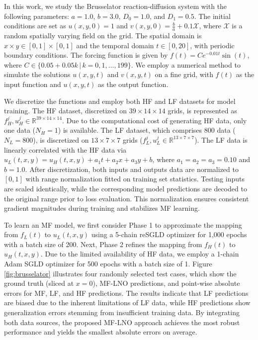 In this work, we study the Brusselator reaction-diffusion system with the following parameters: $a=1.0$, $b=3.0$, $D_0=1.0$, and $D_1=0.5$. The initial conditions are set as $u(x, y, 0) = 1$ and $v(x, y, 0) = \frac{b}{a} + 0.1\mathcal{X}$, where $\mathcal{X}$ is a random spatially varying field on the grid. The spatial domain is $x \times y \in [0, 1] \times [0, 1]$ and the temporal domain $t \in [0, 20]$, with periodic boundary conditions. The forcing function is given by $f(t) = C e^{-0.01t} \sin(t)$, where $C \in \{0.05 + 0.05k \,|\, k = 0, 1, \dots, 199\}$. We employ a numerical method to simulate the solutions $u(x, y, t)$ and $v(x, y, t)$ on a fine grid, with $f(t)$ as the input function and $u(x, y, t)$ as the output function.

We discretize the functions and employ both HF and LF datasets for model training. The HF dataset, discretized on $39 \times 14 \times 14$ grids, is represented as $f_H^j, u_H^j \in \mathbb{R}^{39 \times 14 \times 14}$. Due to the computational cost of generating HF data, only one data ($N_H = 1$) is available. The LF dataset, which comprises 800 data ($N_L = 800$), is discretized on $13 \times 7 \times 7$ grids ($f_L^j, u_L^j \in \mathbb{R}^{13 \times 7 \times 7}$). The LF data is linearly correlated with the HF data via $u_L(t, x, y) = u_H(t, x, y) + a_1 t + a_2 x + a_3 y + b$, where $a_1 = a_2 = a_3 = 0.10$ and $b = 1.0$. After discretization, both inputs and outputs data are normalized to $[0, 1]$ with range normalization fitted on training set statistics. Testing inputs are scaled identically, while the corresponding model predictions are decoded to the original range prior to loss evaluation. This normalization ensures consistent gradient magnitudes during training and stabilizes MF learning.

To learn an MF model, we first consider Phase 1 to approximate the mapping from $f_L(t)$ to $u_L(t, x, y)$ using a 5-chain reSGLD optimizer for 1,000 epochs with a batch size of 200. Next, Phase 2 refines the mapping from $f_H(t)$ to $u_H(t, x, y)$. Due to the limited availability of HF data, we employ a 1-chain Adam SGLD optimizer for 500 epochs with a batch size of 1. Figure \ref{fig:brusselator} illustrates four randomly selected test cases, which show the ground truth (sliced at $x = 0$), MF-LNO predictions, and point-wise absolute errors for MF, LF, and HF predictions. The results indicate that LF predictions are biased due to the inherent limitations of LF data, while HF predictions show generalization errors stemming from insufficient training data. By integrating both data sources, the proposed MF-LNO approach achieves the most robust performance and yields the smallest absolute errors on average.  

